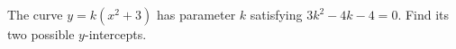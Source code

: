 The curve $y=k(x^2+3)$ has parameter $k$ satisfying $3k^2-4k-4=0$. Find its two possible $y$-intercepts.
